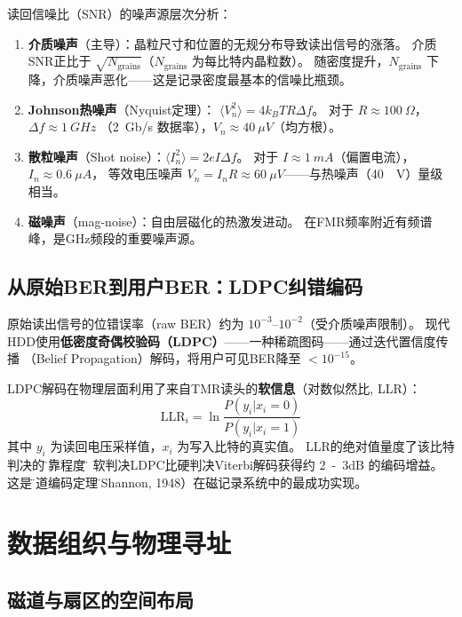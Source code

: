 \documentclass[11pt,a4paper,twoside]{article}
\theoremstyle{definition}
\theoremstyle{plain}
\theoremstyle{remark}
\begin{document}
读回信噪比（SNR）的噪声源层次分析：

\begin{enumerate}
  \item \textbf{介质噪声}（主导）：晶粒尺寸和位置的无规分布导致读出信号的涨落。
  介质SNR正比于 $\sqrt{N_{\text{grains}}}$（$N_{\text{grains}}$ 为每比特内晶粒数）。
  随密度提升，$N_{\text{grains}}$ 下降，介质噪声恶化——这是记录密度最基本的信噪比瓶颈。
  \item \textbf{Johnson热噪声}（Nyquist定理）：
  $\langle V_n^2 \rangle = 4 k_B T R \Delta f$。
  对于 $R \approx \SI{100}{\Omega}$，$\Delta f \approx \SI{1}{GHz}$
  （\SI{2}{Gb/s} 数据率），$V_n \approx \SI{40}{\mu V}$（均方根）。
  \item \textbf{散粒噪声}（Shot noise）：$\langle I_n^2 \rangle = 2 e I \Delta f$。
  对于 $I \approx \SI{1}{mA}$（偏置电流），$I_n \approx \SI{0.6}{\mu A}$，
  等效电压噪声 $V_n = I_n R \approx \SI{60}{\mu V}$——与热噪声（\SI{40}{\mu V}）量级相当。
  \item \textbf{磁噪声}（mag-noise）：自由层磁化的热激发进动。
  在FMR频率附近有频谱峰，是GHz频段的重要噪声源。
\end{enumerate}

\subsection{从原始BER到用户BER：LDPC纠错编码}

原始读出信号的位错误率（raw BER）约为 $10^{-3}$--$10^{-2}$（受介质噪声限制）。
现代HDD使用\textbf{低密度奇偶校验码（LDPC）}——一种稀疏图码——通过迭代置信度传播
（Belief Propagation）解码，将用户可见BER降至 $< 10^{-15}$。

LDPC解码在物理层面利用了来自TMR读头的\textbf{软信息}（对数似然比, LLR）：
\begin{equation}
  \text{LLR}_i = \ln \frac{P(y_i | x_i = 0)}{P(y_i | x_i = 1)}
\end{equation}
其中 $y_i$ 为读回电压采样值，$x_i$ 为写入比特的真实值。
LLR的绝对值量度了该比特判决的\"可靠程度\"，
软判决LDPC比硬判决Viterbi解码获得约 \SI{2}{-3}{dB} 的编码增益。
这是\"信道编码定理\"（Shannon, 1948）在磁记录系统中的最成功实现。

\section{数据组织与物理寻址}
\label{sec:organization}

\subsection{磁道与扇区的空间布局}
\end{document}
